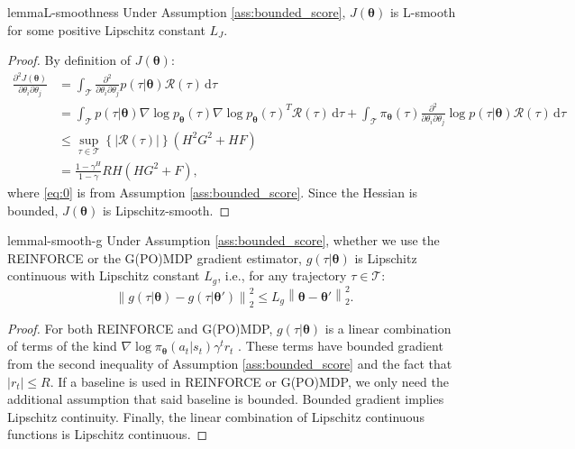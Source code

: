 \documentclass{article}
\makeatletter
\theoremstyle{remark}
\theoremstyle{definition}
\DeclareRobustCommand{\ie}{i.e.,\@\xspace}
\newcommand{\norm}[2][\infty]{\left\|#2\right\|_{#1}}
\newcommand{\Dij}[2]{\frac{\partial^{2}{#1}}{\partial{#2}_i\partial{#2}_j}}
\newcommand{\de}{\,\mathrm{d}}
\newcommand{\vtheta}{\boldsymbol{\theta}}
\newcommand{\Tspace}{\mathcal{T}}
\newcommand{\Reward}{\mathcal{R}}
\newcommand{\pol}{\pi_{\vtheta}}
\newcommand{\score}[2]{\nabla\log p_{#1}(#2)}
\newcommand{\GRADLOG}{G}
\newcommand{\HESSLOG}{F}
\makeatother
\begin{document}
 
\begin{restatable}[]{lemma}{L-smoothness}\label{lemma:lsmooth}
	Under Assumption \ref{ass:bounded_score}, $J(\vtheta)$ is L-smooth for some positive Lipschitz constant $L_J$.
\end{restatable}
\begin{proof}
By definition of $J(\vtheta)$:
\begin{align}
\Dij{J(\vtheta)}{\theta} 
&= \int_{\Tspace}\Dij{}{\theta}p(\tau|\vtheta)\Reward(\tau)\de \tau
\nonumber\\ 
&= \int_{\Tspace}p(\tau|\vtheta)\score{\vtheta}{\tau}\score{\vtheta}{\tau}^T\Reward(\tau)\de \tau + \int_{\Tspace}\pol(\tau)\Dij{}{\theta}\log p(\tau|\vtheta)\Reward(\tau)\de \tau \nonumber\\
&\leq \sup_{\tau \in \mathcal{T}} \left\{\left|\Reward(\tau)\right|\right\} \left(H^2\GRADLOG^2+H\HESSLOG\right) \label{eq:0}\\
&= \frac{1-\gamma^H}{1-\gamma}RH\left(H\GRADLOG^2+\HESSLOG\right),\nonumber
\end{align}
where \ref{eq:0} is from Assumption \ref{ass:bounded_score}.
Since the Hessian is bounded, $J(\vtheta)$ is Lipschitz-smooth.
\end{proof}

\begin{restatable}[]{lemma}{l-smooth-g}\label{lemma:gsmooth}
Under Assumption \ref{ass:bounded_score}, whether we use the REINFORCE or the G(PO)MDP gradient estimator, $g(\tau\vert\vtheta)$ is Lipschitz continuous with Lipschitz constant $L_g$, \ie for any trajectory $\tau\in\Tspace$:
\[
	\norm[2]{g(\tau\vert\vtheta)-g(\tau\vert\vtheta')}^2 \leq L_g\norm[2]{\vtheta-\vtheta'}^2.
\]
\end{restatable}
\begin{proof}
        For both REINFORCE and G(PO)MDP, $g(\tau\vert\vtheta)$ is a linear combination of terms of the kind $\nabla \log \pi_{\vtheta}(a_t\vert s_t)\gamma^t r_t$ \cite{peters2008reinforcement}. These terms have bounded gradient from the second inequality of Assumption \ref{ass:bounded_score} and the fact that $|r_t|\leq R$. If a baseline is used in REINFORCE or G(PO)MDP, we only need the additional assumption that said baseline is bounded.
        Bounded gradient implies Lipschitz continuity. Finally, the linear combination of Lipschitz continuous functions is Lipschitz continuous.
\end{proof}
\end{document}
